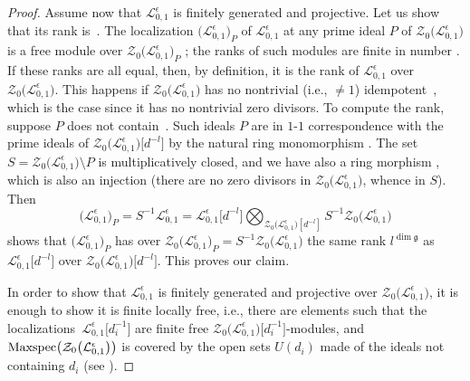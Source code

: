 \documentclass[pdftex]{sigma}
\numberwithin{equation}{section}
\theoremstyle{definition}
\newcommand{\e}{\epsilon}
\newcommand{\Ll}{{\mathcal L}}
\newcommand{\ra}{\rightarrow}
\begin{document}
\begin{proof}
Assume now that $\Ll_{0,1}^\e$ is finitely generated and projective. Let us show that its rank is~. The localization $\bigl(\Ll_{0,1}^\e\bigr)_P$ of $\Ll_{0,1}^\e$ at any prime ideal $P$ of $\mathcal{Z}_0\bigl(\Ll_{0,1}^\e\bigr)$ is a free module over $\mathcal{Z}_0\bigl(\Ll_{0,1}^\e\bigr)_P$ \cite[Proposition~2.12.15]{Rowen}; the ranks of such modules are finite in number \cite[Proposition~2.12.20]{Rowen}. If these ranks are all equal, then, by definition, it is the rank of $\Ll_{0,1}^\e$ over $\mathcal{Z}_0\bigl(\Ll_{0,1}^\e\bigr)$. This happens if $\mathcal{Z}_0\bigl(\Ll_{0,1}^\e\bigr)$ has no nontrivial (i.e., $\ne 1$) idempotent~\cite[Corollary~2.12.23]{Rowen}, which is the case since it has no nontrivial zero divisors. To compute the rank, suppose $P$ does not contain~. Such ideals $P$ are in $1$-$1$ correspondence with the prime ideals of $\mathcal{Z}_0\bigl(\Ll_{0,1}^\e\bigr)\big[d^{-l}\big]$ by the natural ring monomorphism \smash{$\mathcal{Z}_0\bigl(\Ll_{0,1}^\e\bigr) \ra \mathcal{Z}_0\bigl(\Ll_{0,1}^\e\bigr)\big[d^{-l}\big]$}. The set~${S = \mathcal{Z}_0\bigl(\Ll_{0,1}^\e\bigr)\setminus P}$ is multiplicatively closed, and we have also a ring morphism \smash{$\mathcal{Z}_0\bigl(\Ll_{0,1}^\e\bigr)\big[d^{-l}\big] \ra S^{-1}\mathcal{Z}_0\bigl(\Ll_{0,1}^\e\bigr)$}, which is also an injection (there are no zero divisors in $\mathcal{Z}_0\bigl(\Ll_{0,1}^\e\bigr)$, whence in $S$). Then
\[%
\bigl(\Ll_{0,1}^\e\bigr)_P = S^{-1}\Ll_{0,1}^\e = \Ll_{0,1}^\e\big[d^{-l}\big] \bigotimes_{\mathcal{Z}_0\bigl(\Ll_{0,1}^\e\bigr)[d^{-l}]} S^{-1}\mathcal{Z}_0\bigl(\Ll_{0,1}^\e\bigr)
\]
shows that $\bigl(\Ll_{0,1}^\e\bigr)_P$ has over $\mathcal{Z}_0\bigl(\Ll_{0,1}^\e\bigr)_P = S^{-1}\mathcal{Z}_0\bigl(\Ll_{0,1}^\e\bigr)$ the same rank $l^{\dim \mathfrak{g}}$ as $\Ll_{0,1}^\e\big[d^{-l}\big]$ over $\mathcal{Z}_0\bigl(\Ll_{0,1}^\e\bigr)\big[d^{-l}\big]$. This proves our claim.

In order to show that $\Ll_{0,1}^\e$ is finitely generated and projective over $\mathcal{Z}_0\bigl(\Ll_{0,1}^\e\bigr)$, it is enough to show it is finite locally free, i.e., there are elements \smash{$d_i\in \mathcal{Z}_0\bigl(\Ll_{0,1}^\e\bigr)$} such that the localizations~${\Ll_{0,1}^\e\big[d_i^{-1}\big]}$ are finite free $\mathcal{Z}_0\bigl(\Ll_{0,1}^\e\bigr)\big[d_i^{-1}\big]$-modules, and ${\rm Maxspec}\bigl(\mathcal{Z}_0\bigl(\Ll_{0,1}^\e\bigr)\bigl)$ is covered by the open sets $U(d_i)$ made of the ideals not containing $d_i$ (see \cite[Lemma~77.2]{StackP}).


\end{proof}
\end{document}
